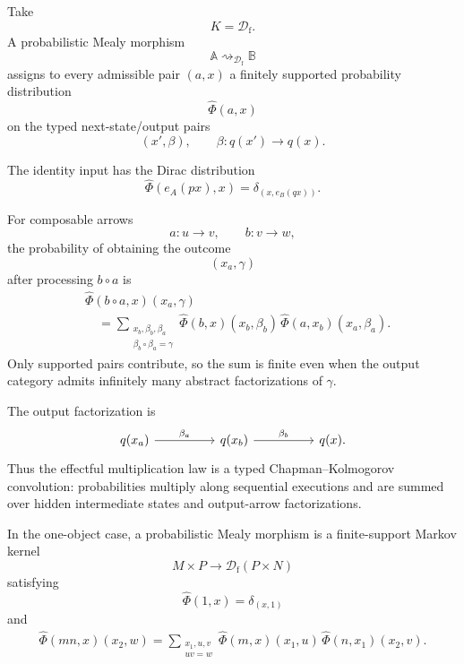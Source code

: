 \begin{example}
\label{example:probabilistic-mealy-morphisms}
    Take
    \[
        K=\mathcal D_{\mathrm f}.
    \]
    A probabilistic Mealy morphism
    \[
        \mathbb A
        \rightsquigarrow_{\mathcal D_{\mathrm f}}
        \mathbb B
    \]
    assigns to every admissible pair \((a,x)\) a finitely supported
    probability distribution
    \[
        \widehat\Phi(a,x)
    \]
    on the typed next-state/output pairs
    \[
        (x',\beta),
        \qquad
        \beta:q(x')\to q(x).
    \]

    The identity input has the Dirac distribution
    \[
        \widehat\Phi(e_A(px),x)
        =
        \delta_{(x,e_B(qx))}.
    \]

    For composable arrows
    \[
        a:u\to v,
        \qquad
        b:v\to w,
    \]
    the probability of obtaining the outcome
    \[
        (x_a,\gamma)
    \]
    after processing \(b\circ a\) is
    \[
    \begin{aligned}
        &
        \widehat\Phi(b\circ a,x)(x_a,\gamma)
        \\
        &\quad=
        \sum_{\substack{
            x_b,\beta_b,\beta_a\\
            \beta_b\circ\beta_a=\gamma
        }}
        \widehat\Phi(b,x)(x_b,\beta_b)\,
        \widehat\Phi(a,x_b)(x_a,\beta_a).
    \end{aligned}
    \]
    Only supported pairs contribute, so the sum is finite even when the
    output category admits infinitely many abstract factorizations of
    \(\gamma\).

    The output factorization is
    \[
        \begin{tikzcd}[column sep=huge]
                q(x_a)
                    \arrow[r, "\beta_a"]
            &
                q(x_b)
                    \arrow[r, "\beta_b"]
            &
                q(x).
        \end{tikzcd}
    \]
    Thus the effectful multiplication law is a typed
    Chapman--Kolmogorov convolution: probabilities multiply along sequential
    executions and are summed over hidden intermediate states and output-arrow
    factorizations.

    In the one-object case, a probabilistic Mealy morphism is a finite-support
    Markov kernel
    \[
        M\times P
        \longrightarrow
        \mathcal D_{\mathrm f}(P\times N)
    \]
    satisfying
    \[
        \widehat\Phi(1,x)
        =
        \delta_{(x,1)}
    \]
    and
    \[
    \begin{aligned}
        \widehat\Phi(mn,x)(x_2,w)
        =
        \sum_{\substack{x_1,u,v\\uv=w}}
        \widehat\Phi(m,x)(x_1,u)\,
        \widehat\Phi(n,x_1)(x_2,v).
    \end{aligned}
    \]
\end{example}

